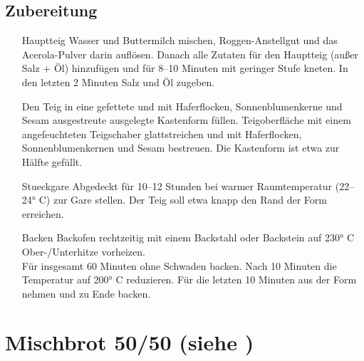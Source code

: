 \subsection*{Zubereitung}
\begin{enumerate}
    \item  [\Gls{Hauptteig}]  Wasser und Buttermilch mischen, Roggen-Anstellgut und das Acerola-Pulver darin auflösen. Danach alle Zutaten für den Hauptteig (außer Salz + Öl) hinzufügen und für 8–10 Minuten mit geringer Stufe kneten. In den letzten 2 Minuten Salz und Öl zugeben.
    \item [\GLS{Formen}] Den Teig in eine gefettete und mit Haferflocken, Sonnenblumenkerne und Sesam ausgestreute ausgelegte Kastenform füllen. Teigoberfläche mit einem angefeuchteten Teigschaber glattstreichen und mit Haferflocken, Sonnenblumenkernen und
    Sesam bestreuen. Die Kastenform ist etwa zur Hälfte gefüllt.
    \item [\Gls{Stueckgare}] Abgedeckt für 10–12 Stunden bei warmer Raumtemperatur (22–24° C) zur Gare stellen. Der Teig soll etwa knapp den Rand der Form erreichen.
    \item [\Gls{Backen}] Backofen rechtzeitig mit einem Backstahl oder Backstein auf 230° C Ober-/Unterhitze vorheizen. \\
    Für insgesamt 60 Minuten ohne Schwaden backen. Nach 10 Minuten die Temperatur auf
    200° C reduzieren. Für die letzten 10 Minuten aus der Form nehmen und zu Ende backen. 
\end{enumerate}



\section[Mischbrot 50/50]{Mischbrot 50/50 \textmd{(siehe \cite[130]{SonjaBauer2021})}}    

